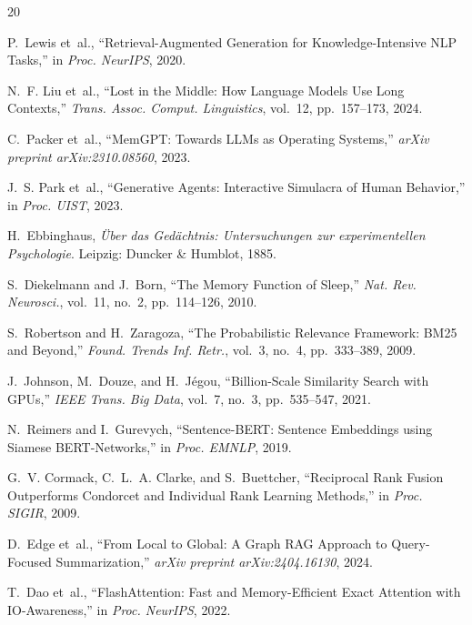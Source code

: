 \documentclass[conference]{IEEEtran}
\begin{document}

\begin{thebibliography}{20}

P.~Lewis et~al.,
``Retrieval-Augmented Generation for Knowledge-Intensive NLP Tasks,''
in \emph{Proc. NeurIPS}, 2020.

N.~F. Liu et~al.,
``Lost in the Middle: How Language Models Use Long Contexts,''
\emph{Trans. Assoc. Comput. Linguistics}, vol.~12, pp.~157--173, 2024.

C.~Packer et~al.,
``MemGPT: Towards LLMs as Operating Systems,''
\emph{arXiv preprint arXiv:2310.08560}, 2023.

J.~S. Park et~al.,
``Generative Agents: Interactive Simulacra of Human Behavior,''
in \emph{Proc. UIST}, 2023.

H.~Ebbinghaus,
\emph{\"Uber das Ged\"achtnis: Untersuchungen zur experimentellen Psychologie}.
Leipzig: Duncker \& Humblot, 1885.

S.~Diekelmann and J.~Born,
``The Memory Function of Sleep,''
\emph{Nat. Rev. Neurosci.}, vol.~11, no.~2, pp.~114--126, 2010.

S.~Robertson and H.~Zaragoza,
``The Probabilistic Relevance Framework: BM25 and Beyond,''
\emph{Found. Trends Inf. Retr.}, vol.~3, no.~4, pp.~333--389, 2009.

J.~Johnson, M.~Douze, and H.~J{\'e}gou,
``Billion-Scale Similarity Search with GPUs,''
\emph{IEEE Trans. Big Data}, vol.~7, no.~3, pp.~535--547, 2021.

N.~Reimers and I.~Gurevych,
``Sentence-BERT: Sentence Embeddings using Siamese BERT-Networks,''
in \emph{Proc. EMNLP}, 2019.

G.~V. Cormack, C.~L.~A. Clarke, and S.~Buettcher,
``Reciprocal Rank Fusion Outperforms Condorcet and Individual Rank Learning
Methods,''
in \emph{Proc. SIGIR}, 2009.

D.~Edge et~al.,
``From Local to Global: A Graph RAG Approach to Query-Focused Summarization,''
\emph{arXiv preprint arXiv:2404.16130}, 2024.

T.~Dao et~al.,
``FlashAttention: Fast and Memory-Efficient Exact Attention with IO-Awareness,''
in \emph{Proc. NeurIPS}, 2022.


\end{thebibliography}
\end{document}
